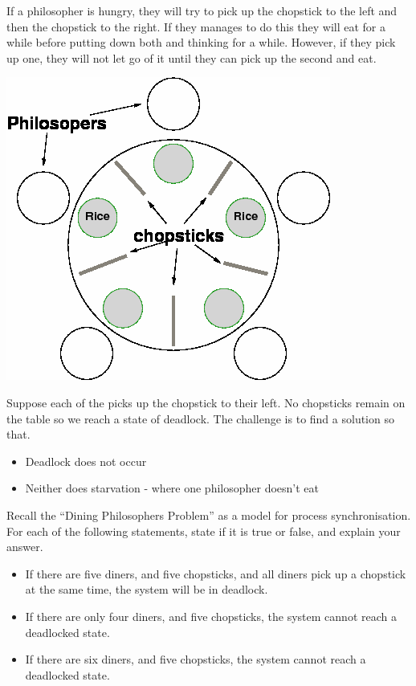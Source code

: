 \documentclass[a4paper, 10pt]{article}
\begin{document}
\begin{minipage}{0.48\textwidth}
    If a philosopher is hungry, they will try to pick up the chopstick to the left and then the chopstick to the right. If they manages to do this they will eat for a while before putting down both and thinking for a while. However, if they pick up one, they will not let go of it until they can pick up the second and eat.
\end{minipage}
\begin{minipage}{0.48\textwidth}
    \begin{center}
        \includegraphics[scale=0.3]{images/diningPhilosophers.png}
    \end{center}
\end{minipage}
Suppose each of the picks up the chopstick to their left. No chopsticks remain on the table so we reach a state of deadlock. The challenge is to find a solution so that.
\begin{itemize}
    \item Deadlock does not occur
    \item Neither does starvation - where one philosopher doesn't eat
\end{itemize}
Recall the “Dining Philosophers Problem” as a model for process synchronisation. For each of the following statements, state if it is true or false, and explain your answer.
\begin{itemize}
    \item If there are five diners, and five chopsticks, and all diners pick up a chopstick at the same time, the system will be in deadlock.
    \item If there are only four diners, and five chopsticks, the system cannot reach a deadlocked state.
    \item If there are six diners, and five chopsticks, the system cannot reach a deadlocked state.
\end{itemize}
\end{document}
